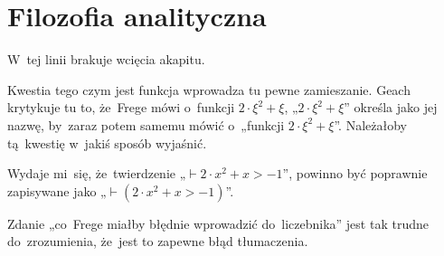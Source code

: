 \documentclass[a4paper,11pt]{article}
\begin{document}
\newpage

\section{Filozofia analityczna}

\vspace{\spaceTwo}




\vspace{0em}



\vspace{0em}


\noindent
{} W~tej linii brakuje wcięcia akapitu.

\vspace{\spaceFour}





\noindent
{} Kwestia tego czym jest funkcja wprowadza tu
pewne zamieszanie. Geach krytykuje tu to, że~Frege mówi o~funkcji
$2 \cdot \xi^{ 2 } + \xi$, „$2 \cdot \xi^{ 2 } + \xi$” określa jako
jej nazwę, by~zaraz potem samemu mówić o~„funkcji
$2 \cdot \xi^{ 2 } + \xi$”. Należałoby tą~kwestię w~jakiś sposób
wyjaśnić.

\vspace{\spaceFour}





\noindent
{} Wydaje mi~się, że~twierdzenie „$\vdash 2 \cdot x^{ 2 } + x > -1$”, powinno
być poprawnie zapisywane jako „$\vdash( 2 \cdot x^{ 2 } + x > -1)$”.

\vspace{\spaceFour}





\noindent
{} Zdanie „co~Frege miałby błędnie wprowadzić do~liczebnika”
jest tak trudne do~zrozumienia, że~jest to zapewne błąd tłumaczenia.

\vspace{\spaceFour}
\end{document}
